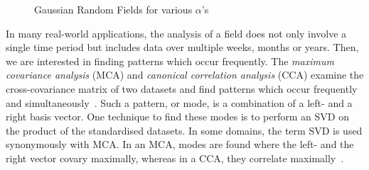 \documentclass[ijgi,article,submit,moreauthors,pdftex,10pt,a4paper]{Definitions/mdpi}
\begin{document}
\begin{figure}[H]
\hspace{8mm}
\caption{Gaussian Random Fields for various $\alpha$'s}
\label{fig:GaussianRandomField}
\end{figure}

In many real-world applications, the analysis of a field does not only involve a single time period but includes data over multiple weeks, months or years. Then, we are interested in finding patterns which occur frequently. The \textit{maximum covariance analysis} (MCA) and \textit{canonical correlation analysis} (CCA) examine the cross-covariance matrix of two datasets and find patterns which occur frequently and simultaneously~\cite{Eshel2011, Storch1999}. Such a pattern, or mode, is a combination of a left- and a right basis vector. One technique to find these modes is to perform an SVD on the product of the standardised datasets. In some domains, the term SVD is used synonymously with MCA. In an MCA, modes are found where the left- and the right vector covary maximally, whereas in a CCA, they correlate maximally~\cite{Bretherton1992}.
\end{document}
